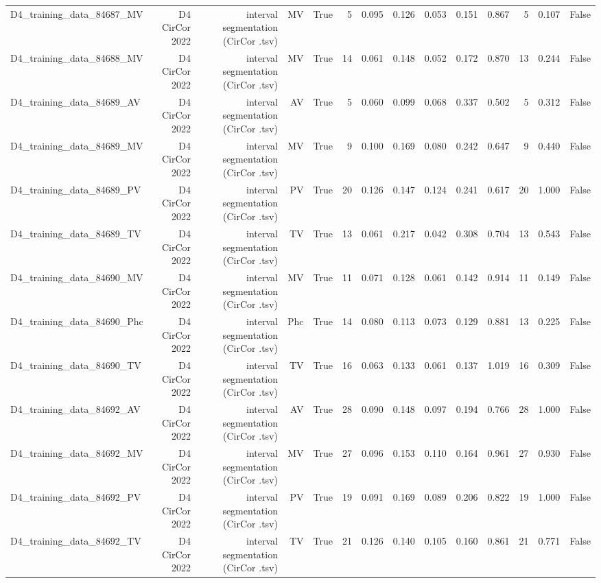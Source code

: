 \begin{table}[htbp]
\begin{tabular}{lrrrrrrrrrrrrr}
    D4\_training\_data\_84687\_MV & D4 CirCor 2022 & interval segmentation (CirCor .tsv) & MV & True & 5 & 0.095 & 0.126 & 0.053 & 0.151 & 0.867 & 5 & 0.107 & False \\
    D4\_training\_data\_84688\_MV & D4 CirCor 2022 & interval segmentation (CirCor .tsv) & MV & True & 14 & 0.061 & 0.148 & 0.052 & 0.172 & 0.870 & 13 & 0.244 & False \\
    D4\_training\_data\_84689\_AV & D4 CirCor 2022 & interval segmentation (CirCor .tsv) & AV & True & 5 & 0.060 & 0.099 & 0.068 & 0.337 & 0.502 & 5 & 0.312 & False \\
    D4\_training\_data\_84689\_MV & D4 CirCor 2022 & interval segmentation (CirCor .tsv) & MV & True & 9 & 0.100 & 0.169 & 0.080 & 0.242 & 0.647 & 9 & 0.440 & False \\
    D4\_training\_data\_84689\_PV & D4 CirCor 2022 & interval segmentation (CirCor .tsv) & PV & True & 20 & 0.126 & 0.147 & 0.124 & 0.241 & 0.617 & 20 & 1.000 & False \\
    D4\_training\_data\_84689\_TV & D4 CirCor 2022 & interval segmentation (CirCor .tsv) & TV & True & 13 & 0.061 & 0.217 & 0.042 & 0.308 & 0.704 & 13 & 0.543 & False \\
    D4\_training\_data\_84690\_MV & D4 CirCor 2022 & interval segmentation (CirCor .tsv) & MV & True & 11 & 0.071 & 0.128 & 0.061 & 0.142 & 0.914 & 11 & 0.149 & False \\
    D4\_training\_data\_84690\_Phc & D4 CirCor 2022 & interval segmentation (CirCor .tsv) & Phc & True & 14 & 0.080 & 0.113 & 0.073 & 0.129 & 0.881 & 13 & 0.225 & False \\
    D4\_training\_data\_84690\_TV & D4 CirCor 2022 & interval segmentation (CirCor .tsv) & TV & True & 16 & 0.063 & 0.133 & 0.061 & 0.137 & 1.019 & 16 & 0.309 & False \\
    D4\_training\_data\_84692\_AV & D4 CirCor 2022 & interval segmentation (CirCor .tsv) & AV & True & 28 & 0.090 & 0.148 & 0.097 & 0.194 & 0.766 & 28 & 1.000 & False \\
    D4\_training\_data\_84692\_MV & D4 CirCor 2022 & interval segmentation (CirCor .tsv) & MV & True & 27 & 0.096 & 0.153 & 0.110 & 0.164 & 0.961 & 27 & 0.930 & False \\
    D4\_training\_data\_84692\_PV & D4 CirCor 2022 & interval segmentation (CirCor .tsv) & PV & True & 19 & 0.091 & 0.169 & 0.089 & 0.206 & 0.822 & 19 & 1.000 & False \\
    D4\_training\_data\_84692\_TV & D4 CirCor 2022 & interval segmentation (CirCor .tsv) & TV & True & 21 & 0.126 & 0.140 & 0.105 & 0.160 & 0.861 & 21 & 0.771 & False \\

\end{tabular}
\end{table}
